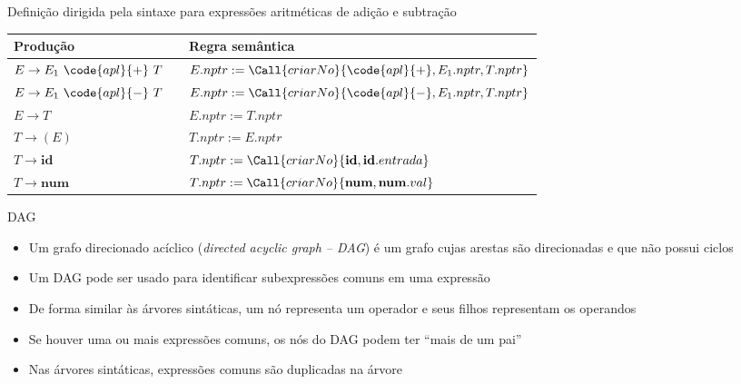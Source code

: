 \begin{frame}[fragile]{Definição dirigida pela sintaxe para expressões aritméticas de adição e subtração}

    \begin{table}
        \centering
        \begin{tabular}{lp{2cm}l}
        \toprule
        \textbf{Produção} & & \textbf{Regra semântica} \\
        \midrule
        $E\to E_1\ \code{apl}{+}\ T$ & & $E.nptr := \Call{criarNo}{\code{apl}{+}, E_1.nptr, T.nptr}$ \\
        \rowcolor[gray]{0.9}
        $E\to E_1\ \code{apl}{-}\ T$ & & $E.nptr := \Call{criarNo}{\code{apl}{-}, E_1.nptr, T.nptr}$ \\
        $E\to T$ & & $E.nptr := T.nptr$ \\
        \rowcolor[gray]{0.9}
        $T\to (E)$ & & $T.nptr := E.nptr$ \\
        $T\to \textbf{id}$ & & $T.nptr := \Call{criarNo}{\textbf{id}, \textbf{id}.entrada}$ \\
        \rowcolor[gray]{0.9}
        $T\to \textbf{num}$ & & $T.nptr := \Call{criarNo}{\textbf{num}, \textbf{num}.val}$ \\
        \bottomrule
        \end{tabular} 
    \end{table}

\end{frame}

\begin{frame}[fragile]{DAG}

    \begin{itemize}
        \item Um grafo direcionado acíclico (\textit{directed acyclic graph -- DAG}) é um grafo cujas arestas são direcionadas e que não possui ciclos

        \item Um DAG pode ser usado para identificar subexpressões comuns em uma expressão

        \item De forma similar às árvores sintáticas, um nó representa um operador e seus filhos representam os operandos

        \item Se houver uma ou mais expressões comuns, os nós do DAG podem ter ``mais de um pai''

        \item Nas árvores sintáticas, expressões comuns são duplicadas na árvore
    \end{itemize}

\end{frame}

